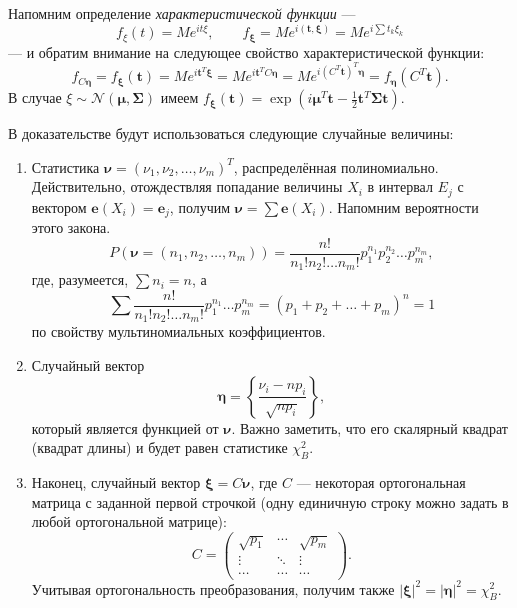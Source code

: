  Напомним определение \emph{характеристической функции} ---
  \[
    f_\xi (t) = M e^{i t \xi},\qquad f_{\bm\xi} = M e^{i (\mathbf t, \bm \xi)} =
    M e^{i \sum t_k \xi_k}
  \]
  --- и обратим внимание на следующее свойство характеристической функции: 
  \[
          f_{C\bm\eta} = f_{\bm \xi} (\mathbf t) = M e^{i \mathbf t^T \bm \xi} = M e^{i \mathbf t^T C
    \bm\eta} =
    M e^{i (C^T \mathbf t)^T \bm \eta} = f_{\bm\eta} (C^T \mathbf t).
  \]
  В случае $ \xi\sim\mathscr N(\bm\mu, \bm\Sigma)
  $ имеем $ f_{\bm\xi}(\mathbf t) = \exp \left( i\bm\mu^T\mathbf t -
  \frac{1}{2}\mathbf t^T\bm\Sigma\mathbf t \right)  $.
  
В доказательстве будут использоваться следующие случайные величины:
\begin{enumerate}
  \item Статистика $ \bm \nu = (\nu_1, \nu_2, \ldots, \nu_m)^T$, распределённая
    полиномиально. Действительно, отождествляя попадание величины $ X_i $ в
    интервал $ E_j $ с вектором $ \mathbf e(X_i) = \mathbf e_j $,
    получим $ \bm \nu = \sum \mathbf e(X_i) $. Напомним вероятности этого
    закона.
    \[
      P(\bm\nu = (n_1, n_2, \dots, n_m)) = \frac{n!}{n_1! n_2! \dots n_m!}
      p_1^{n_1} p_2^{n_2} \dots p_m^{n_m}, 
    \]
  где, разумеется, $\sum n_i = n$, а
  \[
    \sum \frac{n!}{n_1! n_2! \dots n_m!} p_1^{n_1} \dots p_m^{n_m} = (p_1 + p_2
    + \ldots + p_m)^n = 1
  \]
  по свойству мультиномиальных коэффициентов.
    
  \item Случайный вектор
  \[
  \bm\eta = \left\{\frac{\nu_i - np_i}{\sqrt{np_i}}\right\},
  \]
  который является функцией от $ \bm \nu $. Важно заметить, что его скалярный
  квадрат (квадрат длины) и будет равен статистике $ \chi^2_B $.
\item Наконец, случайный вектор $ \bm \xi = C \bm\nu $, где $ C $ --- некоторая
  ортогональная матрица с заданной первой строчкой (одну единичную строку можно задать в
  любой ортогональной матрице): 
  \[
    C = \begin{pmatrix}
      \sqrt{p_1} & \cdots & \sqrt{p_m} \\
      \vdots & \ddots & \vdots \\
      \cdots & \cdots & \cdots
    \end{pmatrix}.
  \]
  Учитывая ортогональность преобразования, получим также $ |\bm\xi|^2 = |\bm\eta|^2 =
  \chi^2_B $.
\end{enumerate}
